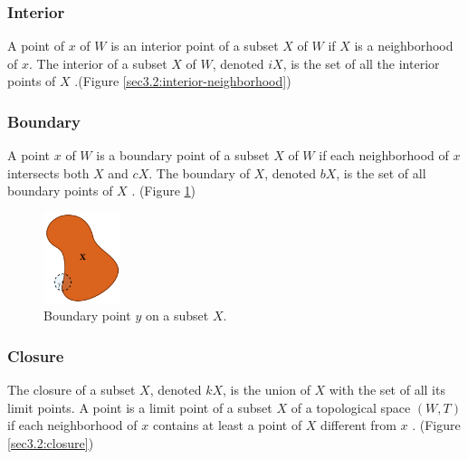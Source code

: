 \documentclass[a4paper,11pt,oneside]{article}
\begin{document}
\subsubsection{Interior}
     
\begin{definition}
	A point of $x$ of $W$ is an interior point of a subset $X$ of $W$ if $X$ is a neighborhood of $x$. The interior of a subset $X$ of $W$, denoted $iX$, is the set of all the interior points of $X$ \cite{Requicha1978MathematicalFO}.(Figure \ref{sec3.2:interior-neighborhood})
\end{definition}
    
\subsubsection{Boundary}
    
\begin{definition}
	A point $x$ of $W$ is a boundary point of a subset $X$ of $W$ if each neighborhood of $x$ intersects both $X$ and $cX$. The boundary of $X$, denoted $bX$, is the set of all boundary points of $X$ \cite{Requicha1978MathematicalFO}. (Figure \ref{sec3.2:boundary})
\end{definition}
    
\begin{figure}[ht]
	\begin{center}
		\includegraphics[width=0.2\textwidth]{section3/3.2/boundary.png}
	\end{center}
	\caption{Boundary point $y$ on a subset $X$.}
	\label{sec3.2:boundary}
\end{figure}
    
\subsubsection{Closure}
    
\begin{definition}
	The closure of a subset $X$, denoted $kX$, is the union of $X$ with the set of all its limit points. A point is a limit point of a subset $X$ of a topological space $(W, T)$ if each neighborhood of $x$ contains at least a point of $X$ different from $x$ \cite{Requicha1978MathematicalFO}. (Figure \ref{sec3.2:closure})
\end{definition}
    
\end{document}
